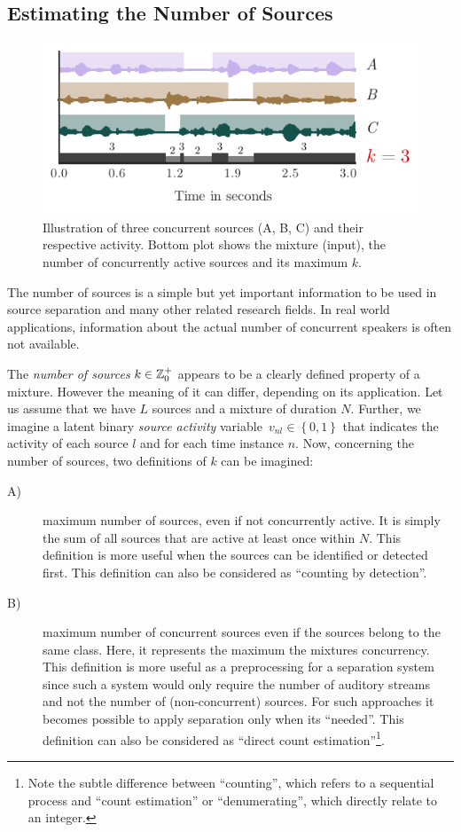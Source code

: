 \subsection{Estimating the Number of Sources}%
\label{sub:count_problemstatement}

\begin{figure}[ht!]
  \centering
  \includegraphics[width=0.8\columnwidth]{Chapters/08_Analysis_CountNet/figures/teaser.pdf}
  \caption{Illustration of three concurrent sources (A, B, C) and their respective activity. Bottom plot shows the mixture (input), the number of concurrently active sources and its maximum \(k\).}%
  \label{fig:teaser}%
\end{figure}

The number of sources is a simple but yet important information to be used in source separation and many other related research fields.
In real world applications, information about the actual number of concurrent speakers is often not available.
\par
The \emph{number of sources} \( k \in \mathbb{Z}^{+}_{0} \) appears to be a clearly defined property of a mixture. 
However the meaning of it can differ, depending on its application.
Let us assume that we have \(L\) sources and a mixture of duration \(N\).
Further, we imagine a latent binary \textit{source activity} variable~$v_{nl}\in \left\{ 0,1 \right\}$ that indicates the activity of each source \(l\) and for each time instance \(n\).
Now, concerning the number of sources, two definitions of \(k\) can be imagined:

\begin{description}
\item[A)] maximum number of sources, even if not concurrently active. It is simply the sum of all sources that are active at least once within \(N\). This definition is more useful when the sources can be identified or detected first. This definition can also be considered as ``counting by detection''.
\item[B)] maximum number of concurrent sources even if the sources belong to the same class. Here, it represents the maximum the mixtures concurrency. This definition is more useful as a preprocessing for a separation system since such a system would only require the number of auditory streams and not the number of (non-concurrent) sources. For such approaches it becomes possible to apply separation only when its ``needed''. This definition can also be considered as ``direct count estimation''\footnote{Note the subtle difference between ``counting'', which refers to a sequential process and ``count estimation'' or ``denumerating'', which directly relate to an integer.}.
\end{description}

